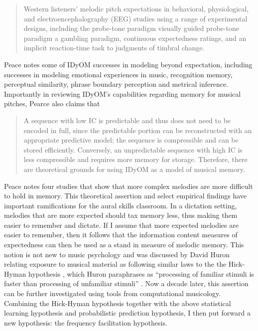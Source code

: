 \documentclass[12pt,]{book}
\begin{document}
\begin{quote}
Western listeners' melodic pitch expectations in behavioral,
physiological, and electroencephalography (EEG) studies using a range of experimental designs, including the probe-tone paradigm visually guided probe-tone paradigm a gambling paradigm, continuous expectedness ratings, and an implicit reaction-time task to judgments of timbral change.
\end{quote}

Peace notes some of IDyOM successes in modeling beyond expectation, including successes in modeling emotional experiences in music, recognition memory, perceptual similarity, phrase boundary perception and metrical inference.
Importantly in reviewing IDyOM's capabilities regarding memory for musical pitches, Pearce also claims that

\begin{quote}
A sequence with low IC is predictable and thus does not need to be encoded in full, since the predictable portion can be reconstructed with an appropriate predictive model; the sequence is compressible and can be stored efficiently. Conversely, an unpredictable sequence with high IC is less compressible and requires more memory for storage. Therefore, there are theoretical grounds for using IDyOM as a model of musical memory.
\end{quote}

Peace notes four studies \citep{bartlettRecognitionTransposedMelodies1980, cohenRecognitionTransposedTone1977, cuddyMusicalPatternRecognition1981, halpernAgingExperienceRecognition1995} that show that more complex melodies are more difficult to hold in memory.
This theoretical assertion and select empirical findings have important ramifications for the aural skills classroom.
In a dictation setting, melodies that are more expected should tax memory less, thus making them easier to remember and dictate.
If I assume that more expected melodies are easier to remember, then it follows that the information content measures of expectedness can then be used as a stand in measure of melodic memory.
This notion is not new to music psychology and was discussed by David Huron relating exposure to musical material as following similar laws to the the Hick-Hyman hypothesis \citep{hickRateGainInformation1952, hymanStimulusInformationDeterminant1953}, which Huron paraphrases as ``processing of familiar stimuli is faster than processing of unfamiliar stimuli'' \citep[p.~63]{huronSweetAnticipation2006}.
Now a decade later, this assertion can be further investigated using tools from computational musicology.
Combining the Hick-Hyman hypothesis together with the above statistical learning hypothesis and probabilistic prediction hypothesis, I then put forward a new hypothesis: the frequency facilitation hypothesis.
\end{document}
